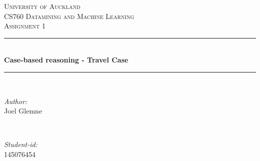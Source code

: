 \documentclass[12pt]{article}
\begin{document}
\begin{titlepage}

\newcommand{\HRule}{\rule{\linewidth}{0.3mm}} %

\center %
 

\textsc{\LARGE University of Auckland}\\[1.5cm] %
\textsc{\Large CS760 Datamining and Machine Learning}\\[0.5cm] %
\textsc{\large Assignment 1}\\[0.5cm] %


\HRule \\[0.4cm]
{ \LARGE \bfseries Case-based reasoning - Travel Case}\\[0.1cm] %
\HRule \\[1.5cm]
 

\begin{minipage}{0.4\textwidth}
\begin{flushleft} \large
\emph{Author:}\\
Joel Glemne
\end{flushleft}
\end{minipage}
~
\begin{minipage}{0.4\textwidth}
\begin{flushright} \large
\emph{Student-id:} \\
145076454
\end{flushright}
\end{minipage}\\[2cm]




\end{titlepage}
\end{document}
